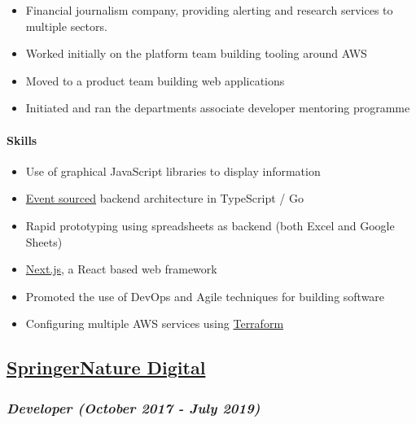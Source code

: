 \begin{itemize}
\tightlist
\item
  Financial journalism company, providing alerting and research services
  to multiple sectors.
\item
  Worked initially on the platform team building tooling around AWS
\item
  Moved to a product team building web applications
\item
  Initiated and ran the departments associate developer mentoring
  programme
\end{itemize}

\hypertarget{skills-0}{%
\paragraph{Skills}\label{skills-0}}

\begin{itemize}
\tightlist
\item
  Use of graphical JavaScript libraries to display information
\item
  \href{https://martinfowler.com/eaaDev/EventSourcing.html}{Event
  sourced} backend architecture in TypeScript / Go
\item
  Rapid prototyping using spreadsheets as backend (both Excel and Google
  Sheets)
\item
  \href{https://nextjs.org/}{Next.js}, a React based web framework
\item
  Promoted the use of DevOps and Agile techniques for building software
\item
  Configuring multiple AWS services using
  \href{https://www.terraform.io/}{Terraform}
\end{itemize}

\hypertarget{springernature-digital}{%
\subsection{\texorpdfstring{\href{http://www.springernature.com}{SpringerNature
Digital}}{SpringerNature Digital}}\label{springernature-digital}}

\hypertarget{developer-october-2017---june-2019}{%
\subsubsection{\texorpdfstring{\emph{Developer (October 2017 - July
2019)}}{Developer (October 2017 - July 2019)}}\label{developer-october-2017---june-2019}}


